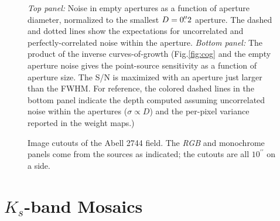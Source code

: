 \documentclass[iop, numberedappendix]{emulateapj}
\gdef\arcsec{^{\prime\prime}}
\begin{document}
\begin{figure}[!ht]
\caption{\textit{Top panel:} Noise in empty apertures as a function of aperture diameter, normalized to the smallest $D=0\mbox{$.\!\!^{\prime\prime}$}2$ aperture.  The dashed and dotted lines show the expectations for uncorrelated and perfectly-correlated noise within the aperture.  \textit{Bottom panel:} The product of the inverse curves-of-growth (Fig.\ref{fig:cog} and the empty aperture noise gives the point-source sensitivity as a function of aperture size.  The S/N is maximized with an aperture just larger than the FWHM.  For reference, the colored dashed lines in the bottom panel indicate the depth computed assuming uncorrelated noise within the apertures ($\sigma \propto D$) and the per-pixel variance reported in the weight maps.)
\label{fig:depth}}  
\end{figure}

\begin{figure}[!ht]
\caption{Image cutouts of the Abell 2744 field.  The \textit{RGB} and monochrome panels come from the sources as indicated; the cutouts are all $10\arcsec$ on a side.
\label{fig:cutout}}  
\end{figure}


\section{$K_s$-band Mosaics}
\label{s:mosaic}
\end{document}
